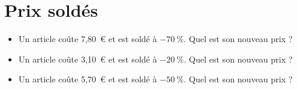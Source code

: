 \documentclass[a4paper,11pt,fleqn]{article}
\begin{document}
\section{Prix soldés}
\begin{itemize}

  \item Un article coûte 7,80~€ et est soldé à $-70~\%$. Quel est son nouveau prix ?
  \item Un article coûte 3,10~€ et est soldé à $-20~\%$. Quel est son nouveau prix ?
  \item Un article coûte 5,70~€ et est soldé à $-50~\%$. Quel est son nouveau prix ?
\end{itemize}
\end{document}
